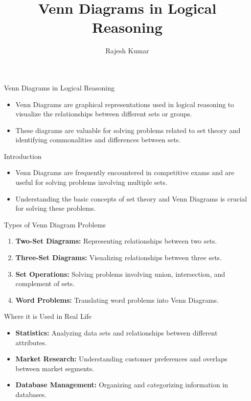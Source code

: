 \title{Venn Diagrams in Logical Reasoning}
\author{Rajesh Kumar}
\date{}

\begin{frame}
  \titlepage
\end{frame}

\begin{frame}{Venn Diagrams in Logical Reasoning}
  \begin{itemize}
    \item Venn Diagrams are graphical representations used in logical reasoning to visualize the relationships between different sets or groups.
    \item These diagrams are valuable for solving problems related to set theory and identifying commonalities and differences between sets.
  \end{itemize}
\end{frame}

\begin{frame}{Introduction}
  \begin{itemize}
    \item Venn Diagrams are frequently encountered in competitive exams and are useful for solving problems involving multiple sets.
    \item Understanding the basic concepts of set theory and Venn Diagrams is crucial for solving these problems.
  \end{itemize}
\end{frame}

\begin{frame}{Types of Venn Diagram Problems}
  \begin{enumerate}
    \item \textbf{Two-Set Diagrams:} Representing relationships between two sets.
    \item \textbf{Three-Set Diagrams:} Visualizing relationships between three sets.
    \item \textbf{Set Operations:} Solving problems involving union, intersection, and complement of sets.
    \item \textbf{Word Problems:} Translating word problems into Venn Diagrams.
  \end{enumerate}
\end{frame}

\begin{frame}{Where it is Used in Real Life}
  \begin{itemize}
    \item \textbf{Statistics:} Analyzing data sets and relationships between different attributes.
    \item \textbf{Market Research:} Understanding customer preferences and overlaps between market segments.
    \item \textbf{Database Management:} Organizing and categorizing information in databases.
  \end{itemize}
\end{frame}

